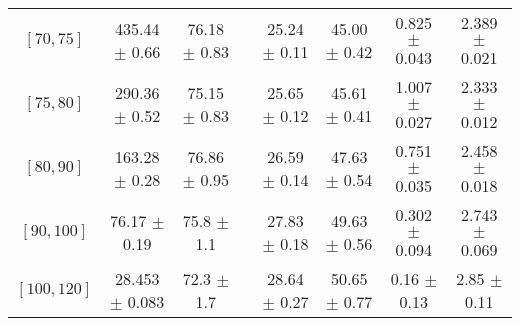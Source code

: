 \begin{tabular}{c||c|c|c|c|c|c|c}
$[70, 75]$ & 435.44 $\pm$ 0.66 & 76.18 $\pm$ 0.83 &  & 25.24 $\pm$ 0.11 & 45.00 $\pm$ 0.42 & 0.825 $\pm$ 0.043 & 2.389 $\pm$ 0.021\\
$[75, 80]$ & 290.36 $\pm$ 0.52 & 75.15 $\pm$ 0.83 &  & 25.65 $\pm$ 0.12 & 45.61 $\pm$ 0.41 & 1.007 $\pm$ 0.027 & 2.333 $\pm$ 0.012\\
$[80, 90]$ & 163.28 $\pm$ 0.28 & 76.86 $\pm$ 0.95 &  & 26.59 $\pm$ 0.14 & 47.63 $\pm$ 0.54 & 0.751 $\pm$ 0.035 & 2.458 $\pm$ 0.018\\
$[90, 100]$ & 76.17 $\pm$ 0.19 & 75.8 $\pm$ 1.1 &  & 27.83 $\pm$ 0.18 & 49.63 $\pm$ 0.56 & 0.302 $\pm$ 0.094 & 2.743 $\pm$ 0.069\\
$[100, 120]$ & 28.453 $\pm$ 0.083 & 72.3 $\pm$ 1.7 &  & 28.64 $\pm$ 0.27 & 50.65 $\pm$ 0.77 & 0.16 $\pm$ 0.13 & 2.85 $\pm$ 0.11\\
\end{tabular}
